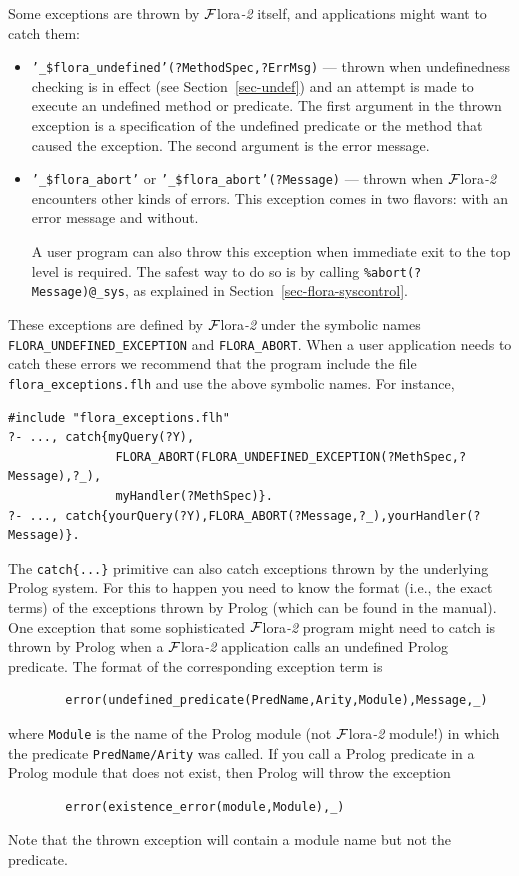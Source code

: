 \documentclass[11pt]{article}
\newcommand{\FLORA}{{\mbox{\sc ${\cal F}${lora}\rm\emph{-2}}}\xspace}
\begin{document}
Some exceptions are thrown by \FLORA itself, and applications might want
to catch them:
\begin{itemize}
\item {\tt '\_\$flora\_undefined'(?MethodSpec,?ErrMsg)} --- thrown when undefinedness checking is
  in effect (see Section~\ref{sec-undef}) and an attempt is made to execute
  an undefined method or predicate. The first argument in the thrown
  exception is a specification of the undefined predicate or the method 
  that caused the exception. The second argument is the error message.
\item {\tt '\_\$flora\_abort'} or {\tt '\_\$flora\_abort'(?Message)} ---
  thrown when \FLORA encounters other kinds of errors. This exception comes
  in two flavors: with an error message and without.

  A user program can also throw this exception when immediate exit to the
  top level is required. The safest way to do so is by calling
  {\tt \verb|%|abort(?Message)@\_sys}, as explained in
  Section~\ref{sec-flora-syscontrol}.
\end{itemize}
These exceptions are defined by \FLORA under the symbolic names {\tt
  FLORA\_UNDEFINED\_EXCEPTION} and {\tt FLORA\_ABORT}. When a user
application needs to catch these errors we recommend that the program
include the file {\tt flora\_exceptions.flh} 
and use the above symbolic
names. For instance,
\begin{verbatim}
#include "flora_exceptions.flh"
?- ..., catch{myQuery(?Y),
               FLORA_ABORT(FLORA_UNDEFINED_EXCEPTION(?MethSpec,?Message),?_),
               myHandler(?MethSpec)}.
?- ..., catch{yourQuery(?Y),FLORA_ABORT(?Message,?_),yourHandler(?Message)}.
\end{verbatim}

The {\tt catch\{...\}} primitive can also catch exceptions thrown by the
underlying Prolog system. For this to happen you need to know the format
(i.e., the exact terms) of the exceptions thrown by Prolog (which can
be found in the manual). One exception that some sophisticated \FLORA
program might need to catch is thrown by Prolog when a \FLORA application
calls an undefined Prolog predicate. The format of the corresponding
exception term is
\begin{verbatim}
        error(undefined_predicate(PredName,Arity,Module),Message,_)  
\end{verbatim}
where {\tt Module} is the name of the Prolog module (not \FLORA module!) in
which the predicate {\tt PredName/Arity} was called. If you call a Prolog
predicate in a Prolog module that does not exist, then Prolog will throw
the exception
\begin{verbatim}
        error(existence_error(module,Module),_)  
\end{verbatim}
Note that the thrown exception will contain a module name but not the predicate.
\end{document}
